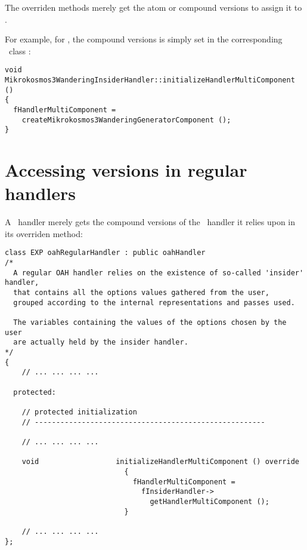 The overriden  methods merely get the atom or compound versions to assign it to .

For example, for , the compound versions is simply set in the corresponding \insider\ class :
\begin{lstlisting}[language=CPlusPlus]
void Mikrokosmos3WanderingInsiderHandler::initializeHandlerMultiComponent ()
{
  fHandlerMultiComponent =
    createMikrokosmos3WanderingGeneratorComponent ();
}
\end{lstlisting}


\section{Accessing versions in regular handlers}\label{Accessing versions in regular handlers}

A \regular\ handler merely gets the compound versions of the \insider\ handler it relies upon in its overriden  method:
\begin{lstlisting}[language=CPlusPlus]
class EXP oahRegularHandler : public oahHandler
/*
  A regular OAH handler relies on the existence of so-called 'insider' handler,
  that contains all the options values gathered from the user,
  grouped according to the internal representations and passes used.

  The variables containing the values of the options chosen by the user
  are actually held by the insider handler.
*/
{
	// ... ... ... ...

  protected:

    // protected initialization
    // ------------------------------------------------------

	// ... ... ... ...

    void                  initializeHandlerMultiComponent () override
                            {
                              fHandlerMultiComponent =
                                fInsiderHandler->
                                  getHandlerMultiComponent ();
                            }

	// ... ... ... ...
};
\end{lstlisting}



